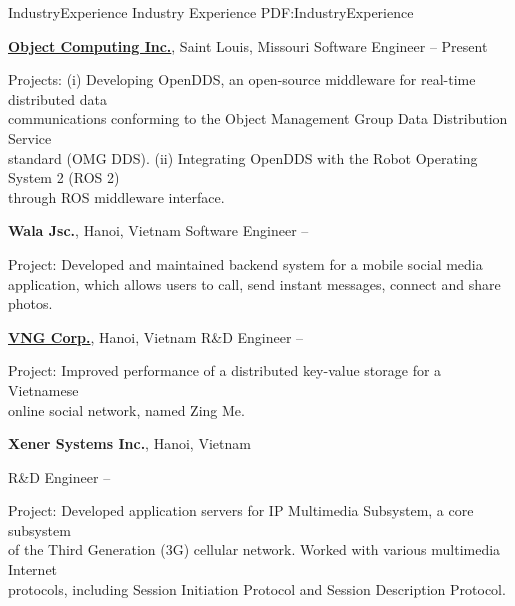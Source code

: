 \documentclass[letterpaper,MMMyyyy,nonstopmode]{simpleresumecv}
\begin{document}
\begin{Body}
\begin{comment}
\end{comment}



\Section
{Industry\newline Experience}
{Industry Experience}
{PDF:IndustryExperience}

\Entry
\href{https://objectcomputing.com/}
{\textbf{Object Computing Inc.}}, Saint Louis, Missouri
\Gap
\BulletItem
Software Engineer
\hfill
{} -- Present
\begin{Detail}
\SubBulletItem
Projects: (i) Developing OpenDDS, an open-source middleware for real-time distributed data \\ 
communications conforming to the Object Management Group Data Distribution Service \\
standard (OMG DDS). (ii) Integrating OpenDDS with the Robot Operating System 2 (ROS 2) \\
through ROS middleware interface.
\end{Detail}
\BigGap

\Entry
{\textbf{Wala Jsc.}}, Hanoi, Vietnam
\Gap
\BulletItem
Software Engineer
\hfill
{} -- 
\begin{Detail}
\SubBulletItem
Project: Developed and maintained backend system for a mobile social media \\
application, which allows users to call, send instant messages, connect and share photos. 
\end{Detail}

\BigGap
\Entry
\href{https://www.vng.com.vn/en/index.html}
{\textbf{VNG Corp.}}, Hanoi, Vietnam
\Gap
\BulletItem
R\&D Engineer
\hfill
{} -- 
\begin{Detail}
\SubBulletItem
Project: Improved performance of a distributed key-value storage for a Vietnamese \\
online social network, named Zing Me. 
\end{Detail}

\BigGap
\Entry
{\textbf{Xener Systems Inc.}}, Hanoi, Vietnam

\Gap
\BulletItem
R\&D Engineer
\hfill
{} -- 
\begin{Detail}
\SubBulletItem
Project: Developed application servers for IP Multimedia Subsystem, a core subsystem \\
of the Third Generation (3G) cellular network. Worked with various multimedia Internet \\
protocols, including Session Initiation Protocol and Session Description Protocol. 
\end{Detail}


\end{Body}
\end{document}
